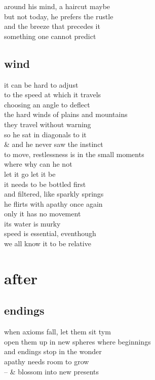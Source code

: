 \documentclass{article}
\begin{document}
around his mind, a haircut maybe\\
but not today, he prefers the rustle\\
and the breeze that precedes it\\
something one cannot predict\\
\clearpage

\subsection{wind}

it can be hard to adjust\\
to the speed at which it travels\\
choosing an angle to deflect\\
the hard winds of plains and mountains\\
they travel without warning\\

so he sat in diagonals to it\\
\& and he never saw the instinct\\
to move, restlessness is in the small moments\\
where why can he not\\
let it go let it be\\

it needs to be bottled first\\
and filtered, like sparkly springs\\
he flirts with apathy once again\\
only it has no movement\\
its water is murky\\
speed is essential, eventhough\\
we all know it to be relative
\clearpage

\section{after}
\subsection{endings}

when axioms fall,  let them sit tym\\
open them up in new spheres where beginnings\\
and endings stop in the wonder\\
apathy needs room to grow\\
-- \& blossom into new presents\\
\end{document}

